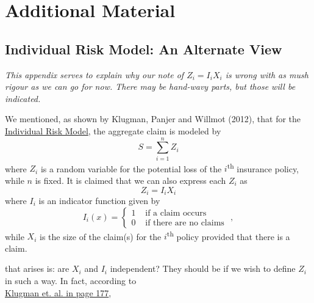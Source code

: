 \documentclass[notoc,notitlepage]{tufte-book}
\begin{document}



\appendix

\chapter{Additional Material}%
\label{chp:additional_material}

\section{Individual Risk Model: An Alternate View}%
\label{sec:individual_risk_model_an_alternate_view}

\textit{This appendix serves to explain why our note of $Z_i = I_i X_i$ is wrong with as mush rigour as we can go for now. There may be hand-wavy parts, but those will be indicated.} 

We mentioned, as shown by Klugman, Panjer and Willmot (2012)\cite{KlugmanPanjerWillmot2012}, that for the \hyperref[defn:individual_risk_model]{Individual Risk Model}, the aggregate claim is modeled by
\begin{equation*}
  S = \sum_{i=1}^{n} Z_i
\end{equation*}
where $Z_i$ is a random variable for the potential loss of the $i$\textsuperscript{th} insurance policy, while $n$ is fixed. It is claimed that we can also express each $Z_i$ as
\begin{equation*}
  Z_i = I_i X_i
\end{equation*}
where $I_i$ is an indicator function given by
\begin{equation*}
  I_i(x) = \begin{cases}
    1 & \text{ if a claim occurs } \\
    0 & \text{ if there are no claims }
  \end{cases},
\end{equation*}
while $X_i$ is the size of the claim(s) for the $i$\textsuperscript{th} policy provided that there is a claim.

 that arises is: are $X_i$ and $I_i$ independent? They should be if we wish to define $Z_i$ in such a way. In fact, according to \\
\noindent\textcolor{base16-eighties-magenta}{\underline{Klugman et. al. in page 177}},
\end{document}
